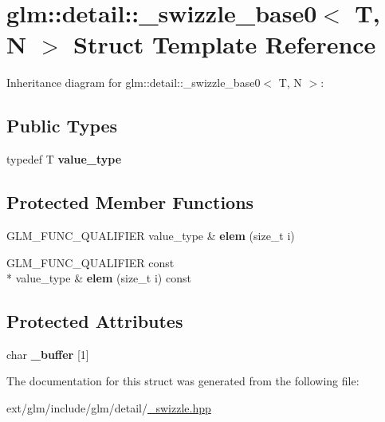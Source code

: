 \hypertarget{structglm_1_1detail_1_1__swizzle__base0}{\section{glm\-:\-:detail\-:\-:\-\_\-swizzle\-\_\-base0$<$ T, N $>$ Struct Template Reference}
\label{structglm_1_1detail_1_1__swizzle__base0}
}


Inheritance diagram for glm\-:\-:detail\-:\-:\-\_\-swizzle\-\_\-base0$<$ T, N $>$\-:
\subsection*{Public Types}
\begin{DoxyCompactItemize}
\item 
\hypertarget{structglm_1_1detail_1_1__swizzle__base0_ad38a739e1fe6d2db2674f34c98159c8f}{typedef T {\bfseries value\-\_\-type}}\label{structglm_1_1detail_1_1__swizzle__base0_ad38a739e1fe6d2db2674f34c98159c8f}

\end{DoxyCompactItemize}
\subsection*{Protected Member Functions}
\begin{DoxyCompactItemize}
\item 
\hypertarget{structglm_1_1detail_1_1__swizzle__base0_aebd942a3c3289f9876a9ede4d710d8f0}{G\-L\-M\-\_\-\-F\-U\-N\-C\-\_\-\-Q\-U\-A\-L\-I\-F\-I\-E\-R value\-\_\-type \& {\bfseries elem} (size\-\_\-t i)}\label{structglm_1_1detail_1_1__swizzle__base0_aebd942a3c3289f9876a9ede4d710d8f0}

\item 
\hypertarget{structglm_1_1detail_1_1__swizzle__base0_a9fb7f491860415b292864d0693d8bdb8}{G\-L\-M\-\_\-\-F\-U\-N\-C\-\_\-\-Q\-U\-A\-L\-I\-F\-I\-E\-R const \\*
value\-\_\-type \& {\bfseries elem} (size\-\_\-t i) const }\label{structglm_1_1detail_1_1__swizzle__base0_a9fb7f491860415b292864d0693d8bdb8}

\end{DoxyCompactItemize}
\subsection*{Protected Attributes}
\begin{DoxyCompactItemize}
\item 
\hypertarget{structglm_1_1detail_1_1__swizzle__base0_afd4b7f15c9acff4cdef808f559ffec2d}{char {\bfseries \-\_\-buffer} \mbox{[}1\mbox{]}}\label{structglm_1_1detail_1_1__swizzle__base0_afd4b7f15c9acff4cdef808f559ffec2d}

\end{DoxyCompactItemize}


The documentation for this struct was generated from the following file\-:\begin{DoxyCompactItemize}
\item 
ext/glm/include/glm/detail/\hyperlink{__swizzle_8hpp}{\-\_\-swizzle.\-hpp}\end{DoxyCompactItemize}
